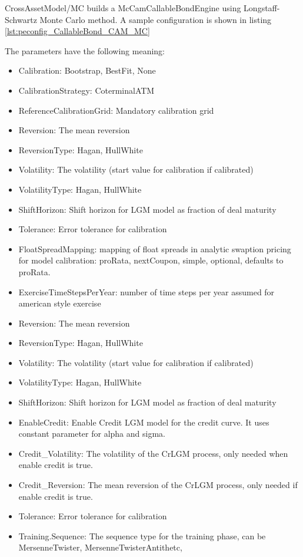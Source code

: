 CrossAssetModel/MC builds a McCamCallableBondEngine using Longstaff-Schwartz Monte Carlo method. A sample
configuration is shown in listing \ref{lst:peconfig_CallableBond_CAM_MC}

The parameters have the following meaning:

\begin{itemize}
\item Calibration: Bootstrap, BestFit, None
\item CalibrationStrategy: CoterminalATM
\item ReferenceCalibrationGrid: Mandatory calibration grid
\item Reversion: The mean reversion
\item ReversionType: Hagan, HullWhite
\item Volatility: The volatility (start value for calibration if calibrated)
\item VolatilityType: Hagan, HullWhite
\item ShiftHorizon: Shift horizon for LGM model as fraction of deal maturity
\item Tolerance: Error tolerance for calibration
\item FloatSpreadMapping: mapping of float spreads in analytic swaption pricing for model calibration: proRata,
  nextCoupon, simple, optional, defaults to proRata.
\item ExerciseTimeStepsPerYear: number of time steps per year assumed for american style exercise
\item Reversion: The mean reversion
\item ReversionType: Hagan, HullWhite
\item Volatility: The volatility (start value for calibration if calibrated)
\item VolatilityType: Hagan, HullWhite
\item ShiftHorizon: Shift horizon for LGM model as fraction of deal maturity
\item EnableCredit: Enable Credit LGM model for the credit curve. It uses constant parameter for alpha and sigma.
\item Credit\_Volatility:  The volatility of the CrLGM process, only needed when enable credit is true.
\item Credit\_Reversion: The mean reversion of the CrLGM process, only needed if enable credit is true.
\item Tolerance: Error tolerance for calibration
\item Training.Sequence: The sequence type for the training phase, can be MersenneTwister, MersenneTwisterAntithetc,

\end{itemize}

